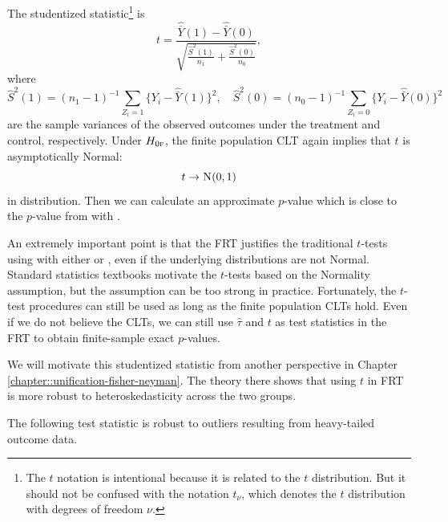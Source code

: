 \begin{example}
\label{eg::studentized-statistic}
The studentized statistic\footnote{The $t$ notation is intentional because it is related to the $t$ distribution. But it should not be confused with the notation $t_\nu$, which denotes the $t$ distribution with degrees of freedom $\nu$.} is 
$$
t = \frac{    \hat{\bar{Y}}(1)  -   \hat{\bar{Y}}(0)    }{  \sqrt{  \frac{  \hat{S}^2(1)  }{n_1}  + \frac{\hat{S}^2(0)}{n_0}  }   },
$$
where 
$$
\hat{S}^2(1) = (n_1 - 1)^{-1} \sum_{Z_i =1} \{ Y_i  -\hat{\bar{Y}}(1)   \}^2,\quad
\hat{S}^2(0) = (n_0 - 1)^{-1} \sum_{Z_i =0} \{ Y_i  -\hat{\bar{Y}}(0)   \}^2 
$$
are the sample variances of the observed outcomes under the treatment and control, respectively. Under $H_{0\textsc{f}}$, the finite population CLT again implies that $t$ is asymptotically Normal: 
$$
t \rightarrow \N01 
$$
in distribution. 
Then we can calculate an approximate $p$-value which is close to the $p$-value from  with .
\end{example}



An extremely important point is that the FRT justifies the traditional $t$-tests using  with either  or , even if the underlying distributions are not Normal. Standard statistics textbooks motivate the $t$-tests based on the Normality assumption, but the assumption can be too strong in practice. Fortunately, the $t$-test procedures can still be used as long as the finite population CLTs hold. Even if we do not believe the CLTs, we can still use $\hat{\tau}$ and $t$ as test statistics in the FRT to obtain finite-sample exact $p$-values. 


We will motivate this studentized statistic from another perspective in Chapter \ref{chapter::unification-fisher-neyman}. The theory there shows that using $t$ in FRT is more robust to heteroskedasticity across the two groups. 


The following test statistic is robust to outliers resulting from heavy-tailed outcome data. 




